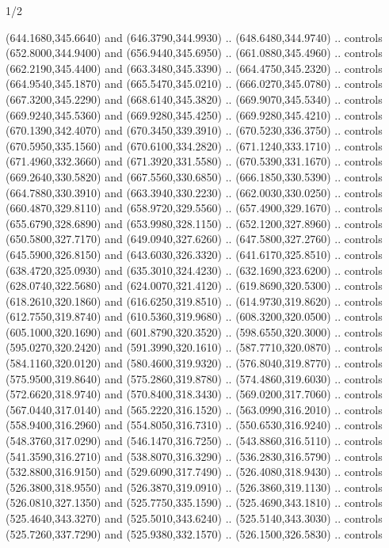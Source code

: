 \begin{flagdescription}{1/2}
\begin{scope}[xshift=0.5\flaglength,yshift=0.5\flagwidth,scale=\flagwidth/759]
\begin{scope}[y=0.8pt, x=0.8pt, yscale=-1,shift={(-720,-480)}]
\begin{scope}[cm={{1.14637,0.0,0.0,1.17117,(33.17849,82.1384)}}]
  (644.1680,345.6640) and (646.3790,344.9930) .. (648.6480,344.9740) .. controls
  (652.8000,344.9400) and (656.9440,345.6950) .. (661.0880,345.4960) .. controls
  (662.2190,345.4400) and (663.3480,345.3390) .. (664.4750,345.2320) .. controls
  (664.9540,345.1870) and (665.5470,345.0210) .. (666.0270,345.0780) .. controls
  (667.3200,345.2290) and (668.6140,345.3820) .. (669.9070,345.5340) .. controls
  (669.9240,345.5360) and (669.9280,345.4250) .. (669.9280,345.4210) .. controls
  (670.1390,342.4070) and (670.3450,339.3910) .. (670.5230,336.3750) .. controls
  (670.5950,335.1560) and (670.6100,334.2820) .. (671.1240,333.1710) .. controls
  (671.4960,332.3660) and (671.3920,331.5580) .. (670.5390,331.1670) .. controls
  (669.2640,330.5820) and (667.5560,330.6850) .. (666.1850,330.5390) .. controls
  (664.7880,330.3910) and (663.3940,330.2230) .. (662.0030,330.0250) .. controls
  (660.4870,329.8110) and (658.9720,329.5560) .. (657.4900,329.1670) .. controls
  (655.6790,328.6890) and (653.9980,328.1150) .. (652.1200,327.8960) .. controls
  (650.5800,327.7170) and (649.0940,327.6260) .. (647.5800,327.2760) .. controls
  (645.5900,326.8150) and (643.6030,326.3320) .. (641.6170,325.8510) .. controls
  (638.4720,325.0930) and (635.3010,324.4230) .. (632.1690,323.6200) .. controls
  (628.0740,322.5680) and (624.0070,321.4120) .. (619.8690,320.5300) .. controls
  (618.2610,320.1860) and (616.6250,319.8510) .. (614.9730,319.8620) .. controls
  (612.7550,319.8740) and (610.5360,319.9680) .. (608.3200,320.0500) .. controls
  (605.1000,320.1690) and (601.8790,320.3520) .. (598.6550,320.3000) .. controls
  (595.0270,320.2420) and (591.3990,320.1610) .. (587.7710,320.0870) .. controls
  (584.1160,320.0120) and (580.4600,319.9320) .. (576.8040,319.8770) .. controls
  (575.9500,319.8640) and (575.2860,319.8780) .. (574.4860,319.6030) .. controls
  (572.6620,318.9740) and (570.8400,318.3430) .. (569.0200,317.7060) .. controls
  (567.0440,317.0140) and (565.2220,316.1520) .. (563.0990,316.2010) .. controls
  (558.9400,316.2960) and (554.8050,316.7310) .. (550.6530,316.9240) .. controls
  (548.3760,317.0290) and (546.1470,316.7250) .. (543.8860,316.5110) .. controls
  (541.3590,316.2710) and (538.8070,316.3290) .. (536.2830,316.5790) .. controls
  (532.8800,316.9150) and (529.6090,317.7490) .. (526.4080,318.9430) .. controls
  (526.3800,318.9550) and (526.3870,319.0910) .. (526.3860,319.1130) .. controls
  (526.0810,327.1350) and (525.7750,335.1590) .. (525.4690,343.1810) .. controls
  (525.4640,343.3270) and (525.5010,343.6240) .. (525.5140,343.3030) .. controls
  (525.7260,337.7290) and (525.9380,332.1570) .. (526.1500,326.5830) .. controls

\end{scope}
\end{scope}
\end{scope}
\end{flagdescription}
